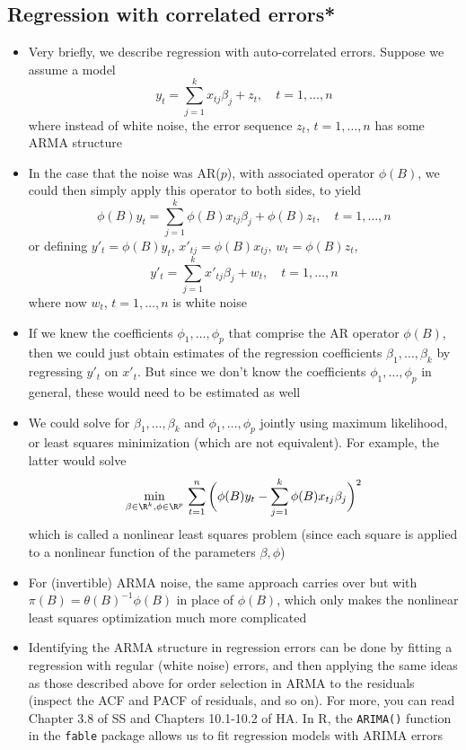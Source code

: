\documentclass{article}
\begin{document}
\subsection{Regression with correlated errors*}

\begin{itemize}
\item Very briefly, we describe regression with auto-correlated errors. Suppose
  we assume a model 
  \[
  y_t = \sum_{j=1}^k x_{tj} \beta_j + z_t, \quad t = 1,\dots,n
  \]
  where instead of white noise, the error sequence $z_t$, $t = 1,\dots,n$ has
  some ARMA structure

\item In the case that the noise was AR($p$), with associated operator
  $\phi(B)$, we could then simply apply this operator to both sides, to yield 
  \[
  \phi(B) y_t = \sum_{j=1}^k \phi(B) x_{tj} \beta_j + \phi(B) z_t, \quad t =
  1,\dots,n  
  \]
  or defining $y'_t = \phi(B) y_t$, $x'_{tj} = \phi(B) x_{tj}$, $w_t = \phi(B)
  z_t$,  
  \[
  y'_t = \sum_{j=1}^k x'_{tj} \beta_j + w_t, \quad t = 1,\dots,n
  \]
  where now $w_t$, $t = 1,\dots,n$ is white noise

\item If we knew the coefficients $\phi_1,\dots,\phi_p$ that comprise the AR
  operator $\phi(B)$, then we could just obtain estimates of the regression
  coefficients $\beta_1,\dots,\beta_k$ by regressing $y'_t$ on $x'_t$. But since
  we don't know the coefficients $\phi_1,\dots,\phi_p$ in general, these would
  need to be estimated as well

\item We could solve for $\beta_1,\dots,\beta_k$ and $\phi_1,\dots,\phi_p$
  jointly using maximum likelihood, or least squares minimization (which are not
  equivalent). For example, the latter would solve  
  \[
  \min_{\beta \in \R^k, \phi \in \R^p} \, \sum_{t=1}^n \bigg( \phi(B) y_t -
  \sum_{j=1}^k \phi(B) x_{tj} \beta_j \bigg)^2
  \]
  which is called a nonlinear least squares problem (since each square is
  applied to a nonlinear function of the parameters $\beta,\phi$)

\item For (invertible) ARMA noise, the same approach carries over but with
  $\pi(B) = \theta(B)^{-1} \phi(B)$ in place of $\phi(B)$, which only makes the
  nonlinear least squares optimization much more complicated

\item Identifying the ARMA structure in regression errors can be done by fitting
  a regression with regular (white noise) errors, and then applying the same
  ideas as those described above for order selection in ARMA to the residuals
  (inspect the ACF and PACF of residuals, and so on). For more, you can read
  Chapter 3.8 of SS and Chapters 10.1-10.2 of HA. In R, the \verb|ARIMA()|
  function in the \verb|fable| package allows us to fit regression models with
  ARIMA errors  
\end{itemize}
\end{document}
